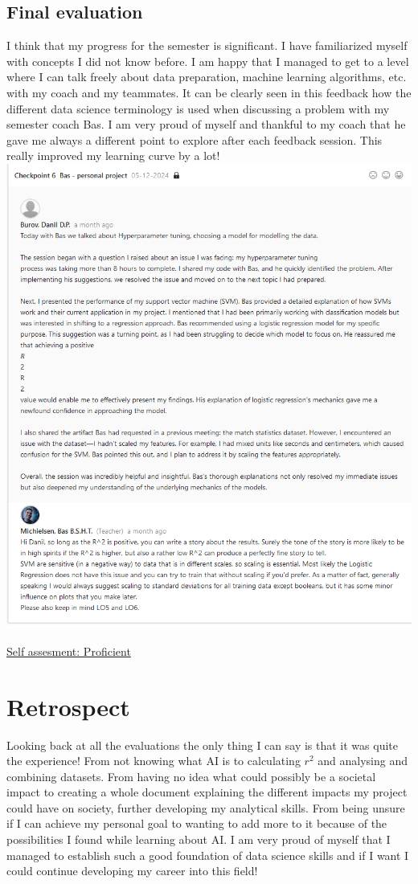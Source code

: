 \documentclass{article}
\begin{document}
\subsection{Final evaluation}
I think that my progress for the semester is significant. I have familiarized myself with concepts I did not know before. I am happy that I managed to get to a level where I can talk freely about data preparation, machine learning algorithms, etc. with my coach and my teammates. It can be clearly seen in this feedback how the different data science terminology is used when discussing a problem with my semester coach Bas. I am very proud of myself and thankful to my coach that he gave me always a different point to explore after each feedback session. This really improved my learning curve by a lot!\\
\includegraphics[width=\textwidth,keepaspectratio]{images/Feedback_Bas_2.png}\\\\
\underline{Self assesment: Proficient}
\section{Retrospect} %
Looking back at all the evaluations the only thing I can say is that it was quite the experience! From not knowing what AI is to calculating $r^2$ and analysing and combining datasets. From having no idea what could possibly be a societal impact to creating a whole document explaining the different impacts my project could have on society, further developing my analytical skills. From being unsure if I can achieve my personal goal to wanting to add more to it because of the possibilities I found while learning about AI. I am very proud of myself that I managed to establish such a good foundation of data science skills and if I want I could continue developing my career into this field!
\end{document}
